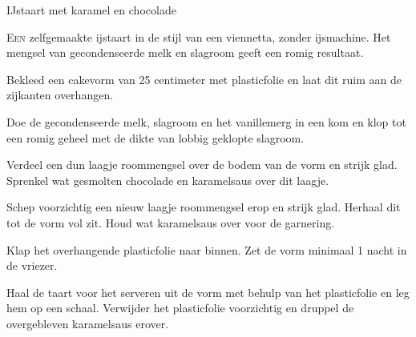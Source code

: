 \begin{recipe}{IJstaart met karamel en chocolade}


\lettrine{E}{en} zelfgemaakte ijstaart in de stijl van een viennetta, zonder
ijsmachine. Het mengsel van gecondenseerde melk en slagroom geeft een romig
resultaat.

\begin{ingredients}
\end{ingredients}

\begin{steps}
  \item Bekleed een cakevorm van 25 centimeter met plasticfolie en laat dit ruim aan
        de zijkanten overhangen.
  \item Doe de gecondenseerde melk, slagroom en het vanillemerg in een kom en klop
        tot een romig geheel met de dikte van lobbig geklopte slagroom.
  \item Verdeel een dun laagje roommengsel over de bodem van de vorm en strijk glad.
        Sprenkel wat gesmolten chocolade en karamelsaus over dit laagje.
  \item Schep voorzichtig een nieuw laagje roommengsel erop en strijk glad. Herhaal
        dit tot de vorm vol zit. Houd wat karamelsaus over voor de garnering.
  \item Klap het overhangende plasticfolie naar binnen. Zet de vorm minimaal 1 nacht
        in de vriezer.
  \item Haal de taart voor het serveren uit de vorm met behulp van het plasticfolie
        en leg hem op een schaal. Verwijder het plasticfolie voorzichtig en druppel de
        overgebleven karamelsaus erover.
\end{steps}
\end{recipe}
